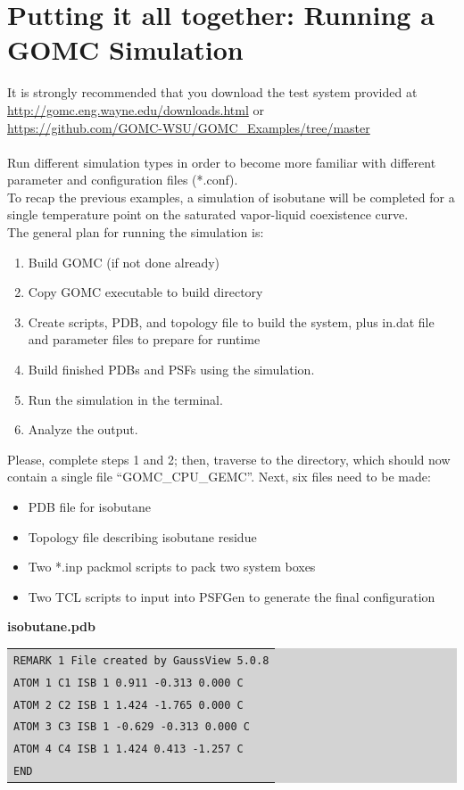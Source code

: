 \section{Putting it all together: Running a GOMC Simulation}
It is strongly recommended that you download the test system provided at\\
\url{http://gomc.eng.wayne.edu/downloads.html} or \\
\url{https://github.com/GOMC-WSU/GOMC_Examples/tree/master}\\\\
Run different simulation types in order to become more familiar with different parameter and configuration files (*.conf).\\
To recap the previous examples, a simulation of isobutane will be completed for a single temperature point on the saturated vapor-liquid coexistence curve.\\
The general plan for running the simulation is:
\begin{enumerate}
\item Build GOMC (if not done already)
\item Copy GOMC executable to build directory
\item Create scripts, PDB, and topology file to build the system, plus in.dat file and parameter files to prepare for runtime
\item Build finished PDBs and PSFs using the simulation.
\item Run the simulation in the terminal.
\item Analyze the output.
\end{enumerate}
Please, complete steps 1 and 2; then, traverse to the directory, which should now contain a single file ``GOMC\_CPU\_GEMC''.
Next, six files need to be made:
\begin{itemize}
\item PDB file for isobutane
\item Topology file describing isobutane residue
\item Two *.inp packmol scripts to pack two system boxes
\item Two TCL scripts to input into PSFGen to generate the final configuration
\end{itemize}
\textbf{isobutane.pdb}\\
\colorbox{lightgray}{
\begin{tabular}{l}
\texttt{REMARK   1 File created by GaussView 5.0.8}\\
\texttt{ATOM      1 C1   ISB     1       0.911  -0.313   0.000		C}\\
\texttt{ATOM      2 C2   ISB     1       1.424  -1.765   0.000		C}\\
\texttt{ATOM      3 C3   ISB     1      -0.629  -0.313   0.000		C}\\
\texttt{ATOM      4 C4   ISB     1       1.424   0.413  -1.257		C}\\
\texttt{END}\\
\end{tabular}}\\\\
